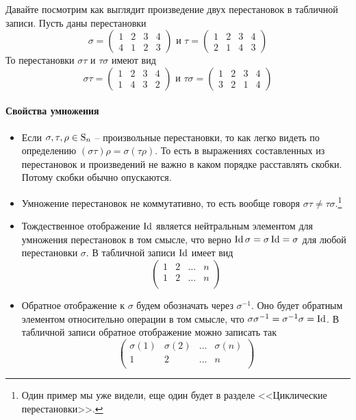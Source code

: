 Давайте посмотрим как выглядит произведение двух перестановок в табличной записи. Пусть даны перестановки
\[
\sigma = 
\begin{pmatrix}
{1}&{2}&{3}&{4}\\
{4}&{1}&{2}&{3}
\end{pmatrix}\text{ и }
\tau = 
\begin{pmatrix}
{1}&{2}&{3}&{4}\\
{2}&{1}&{4}&{3}
\end{pmatrix}
\]
То перестановки $\sigma \tau$ и $\tau\sigma$ имеют вид
\[
\sigma \tau= 
\begin{pmatrix}
{1}&{2}&{3}&{4}\\
{1}&{4}&{3}&{2}
\end{pmatrix}\text{ и }
\tau \sigma= 
\begin{pmatrix}
{1}&{2}&{3}&{4}\\
{3}&{2}&{1}&{4}
\end{pmatrix}
\]


\paragraph{Свойства умножения}
\begin{itemize}
\item Если $\sigma, \tau, \rho \in\operatorname{S}_{n}$ -- произвольные перестановки, то как легко видеть по определению $(\sigma\tau)\rho = \sigma(\tau\rho)$. То есть в выражениях составленных из перестановок и произведений не важно в каком порядке расставлять скобки. Потому скобки обычно опускаются.

\item Умножение перестановок не коммутативно, то есть вообще говоря $\sigma\tau \neq \tau \sigma$.\footnote{Один пример мы уже видели, еще один будет в разделе <<Циклические перестановки>>.} 

\item Тождественное отображение $\operatorname{Id}$ является нейтральным элементом для умножения перестановок в том смысле, что верно $\operatorname{Id} \sigma = \sigma \operatorname{Id} = \sigma$ для любой перестановки $\sigma$. В табличной записи $\operatorname{Id}$ имеет вид
\[
\begin{pmatrix}
{1}&{2}&{\ldots}&{n}\\
{1}&{2}&{\ldots}&{n}\\
\end{pmatrix}
\]

\item Обратное отображение к $\sigma$ будем обозначать через $\sigma^{-1}$. Оно будет обратным элементом относительно операции в том смысле, что $\sigma \sigma^{-1} = \sigma^{-1}\sigma = \operatorname{Id}$. В табличной записи обратное отображение можно записать так
\[
\begin{pmatrix}
{\sigma(1)}&{\sigma(2)}&{\ldots}&{\sigma(n)}\\
{1}&{2}&{\ldots}&{n}\\
\end{pmatrix}
\]
\end{itemize}

